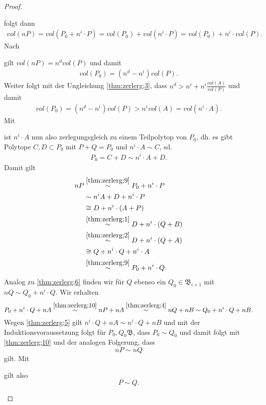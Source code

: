 \documentclass[11pt,titlepage]{article}
\theoremstyle{definition}
\theoremstyle{remark}
\begin{document}
\begin{proof}
\begin{itemize}
			
			folgt dann
			\begin{align*}
				vol(nP)=vol(P_0+n^i\cdot P)=vol(P_0)+vol(n^i\cdot P)=vol(P_0)+
				n^i\cdot vol(P).
			\end{align*}
			Nach 
			
			
			gilt $vol(nP)=n^d vol(P)$ und damit 
			\begin{align}
				vol(P_0)=(n^d -n^i)vol(P). \label{thm:zerlerg;7}
			\end{align}
			Weiter folgt mit der Ungleichung \ref{thm:zerlerg;3}, dass 
			$n^d > n^i+n^i\frac{vol(A)}{vol(P)}$ und damit
			\begin{align}
				vol(P_0)=(n^d -n^i)vol(P)>n^i vol(A)=vol(n^i\cdot A) \label{thm:zerlerg;8}.
			\end{align}
			Mit
			
			
			ist $n^i\cdot A$ nun also zerlegungsgleich zu einem Teilpolytop von $P_0$, dh. es gibt Polytope $C,D\subset P_0$ mit $P+Q=P_0$ und $n^i\cdot A\sim C$, sd. 
			\begin{align}
				P_0=C+D\sim n^i\cdot A+D. \label{thm:zerlerg;9}
			\end{align}
			Damit gilt 
			\begin{align}
				nP &\overset{\ref{thm:zerlerg;9}}{\sim} P_0+n^i \cdot P \notag\\
				&\sim n^iA +D+n^i \cdot P \notag\\
				&\cong D+n^i\cdot(A+P) \notag\\ &\overset{\ref{thm:zerlerg;1}}{\sim} D+n^i\cdot(Q+B) \notag\\
				&\overset{\ref{thm:zerlerg;2}}{\sim} D+n^i\cdot(Q+A) \notag\\
				&\cong Q+n^i\cdot Q +n^i\cdot A \notag\\
				&\overset{\ref{thm:zerlerg;9}}{\sim} P_0+n^i \cdot Q. \label{thm:zerlerg;10}
			\end{align}
			Analog zu \ref{thm:zerlerg;6} finden wir für $Q$ ebenso ein 
			$Q_0\in\mathfrak{B}_{i+1}$ mit $nQ\sim Q_0+n^i\cdot Q$. Wir erhalten 
			\[P_0+n^i\cdot Q+nA\overset{\ref{thm:zerlerg;10}}{\sim}
			nP+nA\overset{\ref{thm:zerlerg;4}}{\sim}nQ+nB\sim Q_0+n^i\cdot Q+nB.\]
			Wegen \ref{thm:zerlerg;5} gilt $n^i\cdot Q+nA\sim n^i\cdot Q +nB$ und 
			mit der Induktionsvoraussetzung folgt für $P_0,Q_0\mathfrak{B}$, dass 
			$P_0\sim Q_0$ und damit folgt mit \ref{thm:zerlerg;10} und der 
			analogen Folgerung, dass 
			\[nP\sim nQ\]
			gilt. Mit
			
			
			gilt also \[P\sim Q.\]
		\end{itemize}
	\end{proof}
	
	
	\newpage
	
	
\end{document}
